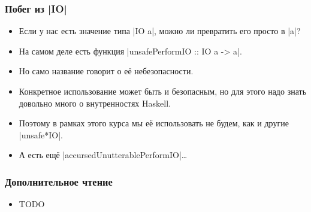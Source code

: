 \documentclass[11pt]{beamer}
\begin{document}
\begin{frame}[fragile]
  \frametitle{Побег из \haskinline|IO|}
  \begin{itemize}
    \item Если у нас есть значение типа \haskinline|IO a|, можно ли превратить его просто в \haskinline|a|?
          \pause
    \item На самом деле есть функция \haskinline|unsafePerformIO :: IO a -> a|.
    \item Но само название говорит о её небезопасности.
    \item Конкретное использование может быть и безопасным, но для этого надо знать довольно много о внутренностях Haskell.
          \pause
    \item Поэтому в рамках этого курса мы её использовать не будем, как и другие \haskinline|unsafe*IO|.
    \item А есть ещё \haskinline|accursedUnutterablePerformIO|\ldots
  \end{itemize}
\end{frame}

\begin{frame}[fragile]
  \frametitle{Дополнительное чтение}
  \begin{itemize}
    \item TODO
  \end{itemize}
\end{frame}
\end{document}
